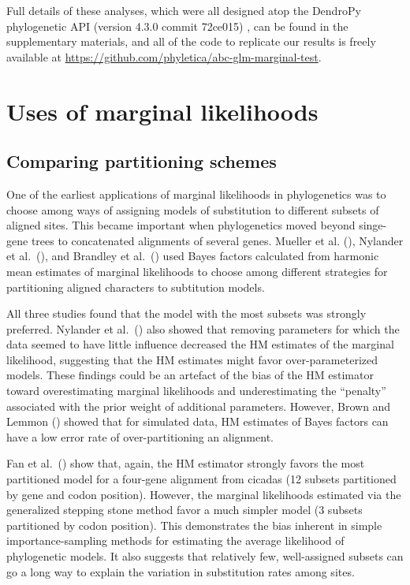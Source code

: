 Full details of these analyses, which were all designed atop the DendroPy
phylogenetic API (version 4.3.0 commit 72ce015) \citep{Sukumaran2010}, can be
found in the supplementary materials, and all of the code to replicate our
results is freely available at
\href{https://github.com/phyletica/abc-glm-marginal-test}{https://github.com/phyletica/abc-glm-marginal-test}.


\section{Uses of marginal likelihoods}


\subsection{Comparing partitioning schemes}

One of the earliest applications of marginal likelihoods in phylogenetics was
to choose among ways of assigning models of substitution to different subsets
of aligned sites.
This became important when phylogenetics moved beyond singe-gene trees to
concatenated alignments of several genes.
Mueller et al. (\citeyear{Mueller2004}),
Nylander et al.\ (\citeyear{NylanderEtal2004}), and
Brandley et al.\ (\citeyear{Brandley2005})
used Bayes factors calculated from harmonic mean
estimates of marginal likelihoods to choose among different strategies for
partitioning aligned characters to subtitution models.

All three studies found that the model with the most subsets was strongly
preferred.
Nylander et al.\ (\citeyear{NylanderEtal2004}) also showed that removing
parameters for which the data seemed to have little influence decreased the HM
estimates of the marginal likelihood, suggesting that the HM estimates might
favor over-parameterized models.
These findings could be an artefact of the bias of the HM estimator toward
overestimating marginal likelihoods and underestimating the ``penalty''
associated with the prior weight of additional parameters.
However, Brown and Lemmon (\citeyear{Brown2007}) showed that for simulated data,
HM estimates of Bayes factors can have a low error rate of over-partitioning an
alignment.

Fan et al.\ (\citeyear{Fan2011}) show that, again, the HM estimator strongly
favors the most partitioned model for a four-gene alignment from cicadas (12
subsets partitioned by gene and codon position).
However, the marginal likelihoods estimated via the generalized stepping stone
method favor a much simpler model (3 subsets partitioned by codon position).
This demonstrates the bias inherent in simple importance-sampling methods
for estimating the average likelihood of phylogenetic models.
It also suggests that relatively few, well-assigned subsets can go a long way
to explain the variation in substitution rates among sites.

